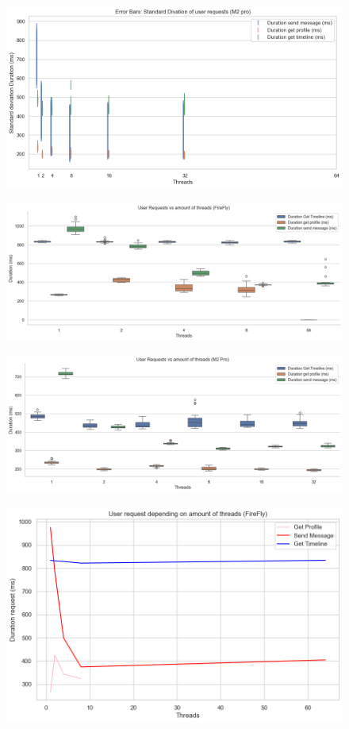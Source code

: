 \documentclass[a4paper]{article}
\begin{document}
\begin{figure}[H]
	\centering
	\includegraphics[width = \linewidth]{Images/SpeedupStdUR.png}
	\caption{}
\end{figure}
\begin{figure}[H]
	\centering
	\includegraphics[width = \linewidth]{Images/SpeedupURBoxFirefly.png}
	\caption{}
\end{figure}
\begin{figure}[H]
	\centering
	\includegraphics[width = \linewidth]{Images/SpeedupURBox.png}
	\caption{}
\end{figure}
\begin{figure}[H]
	\centering
	\includegraphics[width = \linewidth]{Images/SpeedupURMeanFirefly.png}
	\caption{}
\end{figure}
\end{document}
